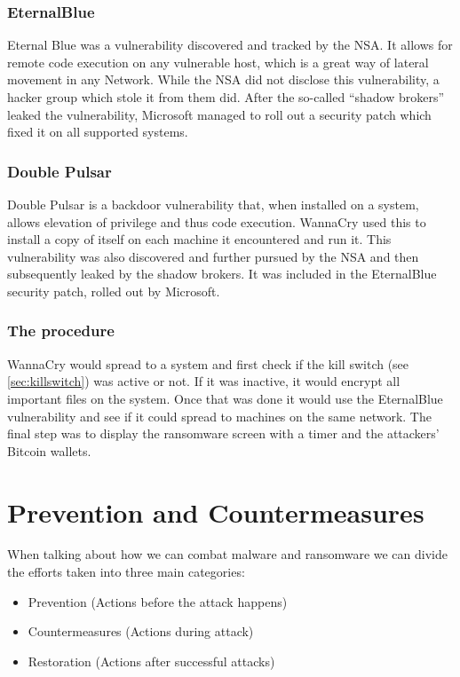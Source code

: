\subsection{EternalBlue}
\label{sec:Eternal_Blue}

Eternal Blue was a vulnerability discovered and tracked by the NSA.
It allows for remote code execution on any vulnerable host, which is a great way of lateral movement in any Network.
While the NSA did not disclose this vulnerability, a hacker group which stole it from them did.
After the so-called %
 \enquote{shadow brokers} leaked the vulnerability, Microsoft managed to roll out a security patch which fixed it on all supported systems.

\subsection{Double Pulsar}
\label{sec:Double_Pulsar}

Double Pulsar is a backdoor vulnerability that, when installed on a system, allows elevation of privilege and thus code execution.
WannaCry used this to install a copy of itself on each machine it encountered and run it.
This vulnerability was also discovered and further pursued by the NSA and then subsequently leaked by the %
 shadow brokers.
It was included in the EternalBlue security patch, rolled out by Microsoft.

\subsection{The procedure}
WannaCry would spread to a system and first check if the kill switch (see \autoref{sec:killswitch}) was active or not.
If it was inactive, it would encrypt all important files on the system.
Once that was done it would use the EternalBlue vulnerability and see if it could spread to machines on the same network.
The final step was to display the ransomware screen with a timer and the attackers' Bitcoin wallets.

\chapter{Prevention and Countermeasures}

When talking about how we can combat malware and ransomware we can divide the efforts taken into three main categories:
\begin{itemize}
    \item Prevention (Actions before the attack happens)
    \item Countermeasures (Actions during attack)
    \item Restoration (Actions after successful attacks)
\end{itemize}


